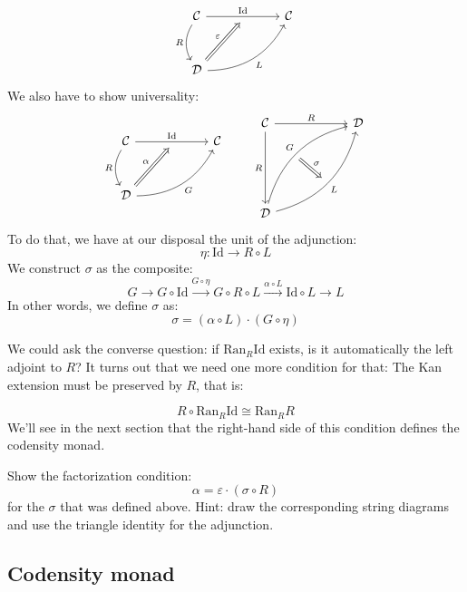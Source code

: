 \documentclass[DaoFP]{subfiles}
\begin{document}
 \[
 \begin{tikzcd} [row sep=1cm, column sep=1cm]
 \cat C
 \arrow[rr, "\text{Id}", "" {name=ID, below} ]
 \arrow[d, bend right, "R"']
 && \cat C
 \\
 \cat D
  \arrow[urr, bend right, "L"']
 \arrow[Rightarrow, "\varepsilon",  to=ID]
 \end{tikzcd}
\]
We also have to show universality:
\[
 \begin{tikzcd} [row sep=1cm, column sep=1cm]
 \cat C
 \arrow[rr, "\text{\text{Id}}", "" {name=ID, below} ]
 \arrow[d, bend right, "R"']
 && \cat C
 \\
 \cat D
  \arrow[urr, bend right, "G"']
 \arrow[Rightarrow, "\alpha",  to=ID]
 \end{tikzcd}
 \qquad %
\begin{tikzcd}[row sep=2cm, column sep=2cm]
\cat C  \ar[d, "R"', "" {name=P}]
            \ar[r, "R", ""  {name=F, below, near start, bend right}]
&
\cat D
\\
\cat D
    \ar[ur, bend left, "G", "" {name=G, below}]
    \ar[ur, bend right, "L"', "" {name=Ran}]
\arrow[Rightarrow, "\sigma", from=G, to=Ran]
\end{tikzcd}
\]
To do that, we have at our disposal the unit of the adjunction:
\[ \eta \colon \text{Id} \to R \circ L \]
We construct $\sigma$ as the composite:
\[ G \rightarrow G \circ \text{Id} \xrightarrow{G \circ \eta} G \circ R \circ L \xrightarrow{\alpha \circ L} \text{Id} \circ L \rightarrow L\]
In other words, we define $\sigma$ as:
\[ \sigma = (\alpha \circ L) \cdot (G \circ \eta) \]

We could ask the converse question: if $\text{Ran}_R \text{Id}$ exists, is it automatically the left adjoint to $R$? It turns out that we need one more condition for that: The Kan extension must be preserved by $R$, that is:

\[ R \circ \text{Ran}_R \text{Id} \cong \text{Ran}_R R \]
We'll see in the next section that the right-hand side of this condition defines the codensity monad.

\begin{exercise}
Show the factorization condition: 
\[ \alpha = \varepsilon \cdot (\sigma \circ R) \]
for the $\sigma$ that was defined above. Hint: draw the corresponding string diagrams and use the triangle identity for the adjunction.
\end{exercise}

 \subsection{Codensity monad}
 
\end{document}

